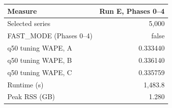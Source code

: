 \begin{tabular}{@{}lr@{}}
\toprule
Measure & Run E, Phases 0--4 \\
\midrule
Selected series & 5,000 \\
FAST\_MODE (Phases 0--4) & false \\
q50 tuning WAPE, A & 0.333440 \\
q50 tuning WAPE, B & 0.336140 \\
q50 tuning WAPE, C & 0.335759 \\
Runtime (s) & 1,483.8 \\
Peak RSS (GB) & 1.280 \\
\bottomrule
\end{tabular}
